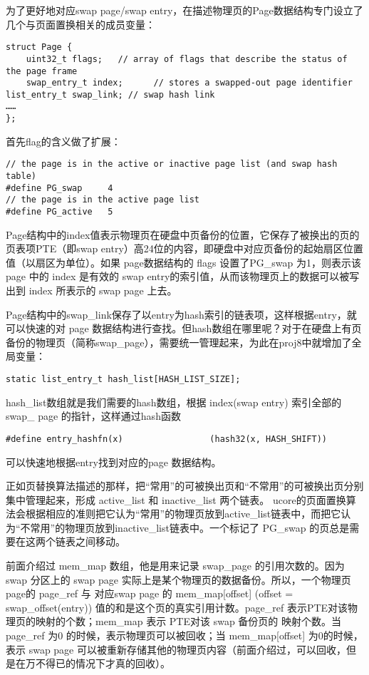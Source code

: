 为了更好地对应swap page/swap
entry，在描述物理页的Page数据结构专门设立了几个与页面置换相关的成员变量：

\begin{lstlisting}
struct Page {
    uint32_t flags;   // array of flags that describe the status of the page frame
    swap_entry_t index;      // stores a swapped-out page identifier
list_entry_t swap_link; // swap hash link
……
};
\end{lstlisting}

首先flag的含义做了扩展：

\begin{lstlisting}
// the page is in the active or inactive page list (and swap hash table)
#define PG_swap     4 
// the page is in the active page list
#define PG_active   5
\end{lstlisting}

Page结构中的index值表示物理页在硬盘中页备份的位置，它保存了被换出的页的页表项PTE（即swap
entry）高24位的内容，即硬盘中对应页备份的起始扇区位置值（以扇区为单位）。如果
page数据结构的 flags 设置了PG\_swap 为1，则表示该 page 中的 index
是有效的 swap entry的索引值，从而该物理页上的数据可以被写出到 index
所表示的 swap page 上去。

Page结构中的swap\_link保存了以entry为hash索引的链表项，这样根据entry，就可以快速的对
page
数据结构进行查找。但hash数组在哪里呢？对于在硬盘上有页备份的物理页（简称swap\_page），需要统一管理起来，为此在proj8中就增加了全局变量：

\begin{lstlisting}
static list_entry_t hash_list[HASH_LIST_SIZE];
\end{lstlisting}

hash\_list数组就是我们需要的hash数组，根据 index(swap entry) 索引全部的
swap\_ page 的指针，这样通过hash函数

\begin{lstlisting}
#define entry_hashfn(x)                 (hash32(x, HASH_SHIFT))
\end{lstlisting}

可以快速地根据entry找到对应的page 数据结构。

正如页替换算法描述的那样，把``常用''的可被换出页和``不常用''的可被换出页分别集中管理起来，形成
active\_list 和 inactive\_list 两个链表。
ucore的页面置换算法会根据相应的准则把它认为``常用''的物理页放到active\_list链表中，而把它认为``不常用''的物理页放到inactive\_list链表中。一个标记了
PG\_swap 的页总是需要在这两个链表之间移动。

前面介绍过 mem\_map 数组，他是用来记录 swap\_page 的引用次数的。因为
swap 分区上的 swap page
实际上是某个物理页的数据备份。所以，一个物理页page的 page\_ref 与
对应swap page 的 mem\_map{[}offset{]} (offset = swap\_offset(entry))
值的和是这个页的真实引用计数。page\_ref
表示PTE对该物理页的映射的个数；mem\_map 表示 PTE对该 swap 备份页的
映射个数。当 page\_ref 为0 的时候，表示物理页可以被回收；当
mem\_map{[}offset{]} 为0的时候，表示 swap page
可以被重新存储其他的物理页内容（前面介绍过，可以回收，但是在万不得已的情况下才真的回收）。


